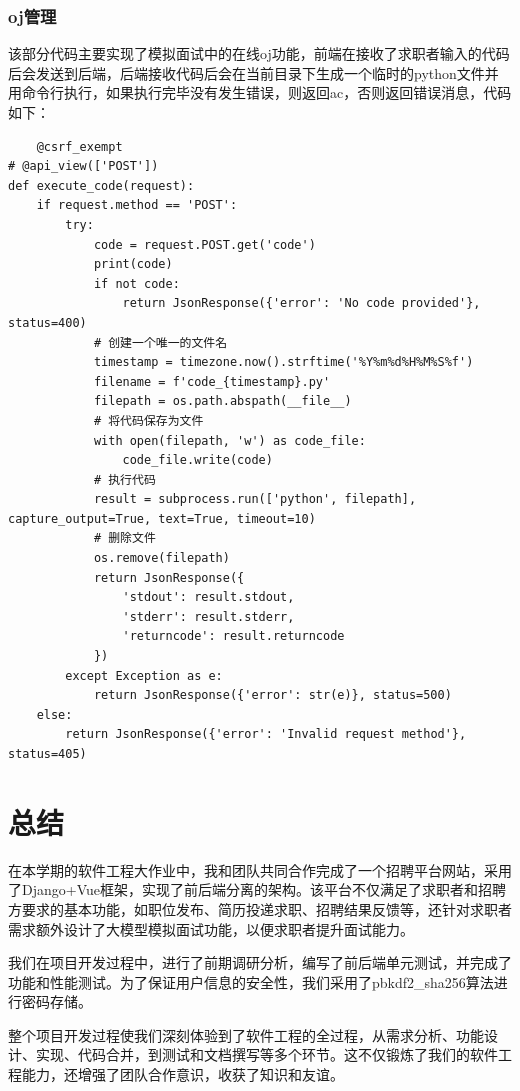 \documentclass[UTF8,a4paper,10pt]{ctexart}
\begin{document}
\subsubsection{oj管理}
该部分代码主要实现了模拟面试中的在线oj功能，前端在接收了求职者输入的代码后会发送到后端，后端接收代码后会在当前目录下生成一个临时的python文件并用命令行执行，如果执行完毕没有发生错误，则返回ac，否则返回错误消息，代码如下：
\begin{lstlisting}
    @csrf_exempt
# @api_view(['POST'])
def execute_code(request):
    if request.method == 'POST':
        try:
            code = request.POST.get('code')
            print(code)
            if not code:
                return JsonResponse({'error': 'No code provided'}, status=400)
            # 创建一个唯一的文件名
            timestamp = timezone.now().strftime('%Y%m%d%H%M%S%f')
            filename = f'code_{timestamp}.py'
            filepath = os.path.abspath(__file__)
            # 将代码保存为文件
            with open(filepath, 'w') as code_file:
                code_file.write(code)
            # 执行代码
            result = subprocess.run(['python', filepath], capture_output=True, text=True, timeout=10)
            # 删除文件
            os.remove(filepath)
            return JsonResponse({
                'stdout': result.stdout,
                'stderr': result.stderr,
                'returncode': result.returncode
            })
        except Exception as e:
            return JsonResponse({'error': str(e)}, status=500)
    else:
        return JsonResponse({'error': 'Invalid request method'}, status=405)
\end{lstlisting}



\section{总结}

在本学期的软件工程大作业中，我和团队共同合作完成了一个招聘平台网站，采用了Django+Vue框架，实现了前后端分离的架构。该平台不仅满足了求职者和招聘方要求的基本功能，如职位发布、简历投递求职、招聘结果反馈等，还针对求职者需求额外设计了大模型模拟面试功能，以便求职者提升面试能力。

我们在项目开发过程中，进行了前期调研分析，编写了前后端单元测试，并完成了功能和性能测试。为了保证用户信息的安全性，我们采用了pbkdf2\_sha256算法进行密码存储。

整个项目开发过程使我们深刻体验到了软件工程的全过程，从需求分析、功能设计、实现、代码合并，到测试和文档撰写等多个环节。这不仅锻炼了我们的软件工程能力，还增强了团队合作意识，收获了知识和友谊。

\end{document}
